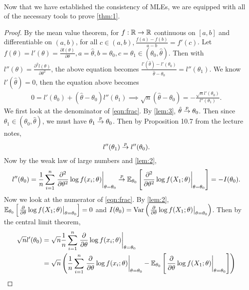 $ $\\
Now that we have established the consistency of MLEs, we are equipped with all of the necessary tools to prove \cref{thm:1}.
\begin{proof}
By the mean value theorem, for $f:\mathbb{R} \rightarrow \mathbb{R}$ continuous on $[a,b]$ and differentiable on $(a,b)$, for all $c\in(a,b), \frac{f(a)-f(b)}{a-b} = f'(c)$. Let $f(\theta) = l'(\theta) = \frac{\partial l(\theta)}{\partial \theta}, a=\hat{\theta}, b=\theta_0, c=\theta_1 \in (\theta_0, \hat{\theta})$. Then with $l''(\theta) = \frac{\partial^2 l(\theta)}{\partial \theta^2}$, the above equation becomes $\frac{l'(\hat{\theta}) - l'(\theta_0)}{\hat{\theta} - \theta_0} = l''(\theta_1)$. We know $l'(\hat{\theta}) = 0$, then the equation above becomes
\begin{align}
0 = l'(\theta_0) + (\hat{\theta} - \theta_0)l''(\theta_1) \implies \sqrt{n}(\hat{\theta} - \theta_0) = -\frac{\sqrt{n}l'(\theta_0)}{l''(\theta_1)}. \label{eqn:frac}
\end{align}
We first look at the denominator of \cref{eqn:frac}. By \cref{lem:3}, $\hat{\theta} \overset{p}{\rightarrow} \theta_0$. Then since $\theta_1\in(\theta_0, \hat{\theta})$, we must have $\theta_1 \overset{p}{\rightarrow} \theta_0$. Then by Proposition 10.7 from the lecture notes, 
\begin{align*}
l''(\theta_1) \overset{p}{\rightarrow} l''(\theta_0).
\end{align*}
Now by the weak law of large numbers and \cref{lem:2},
\begin{align}
l''(\theta_0) = \frac{1}{n}\sum_{i=1}^n \left.\frac{\partial^2}{\partial \theta^2}\log f(x_i; \theta)\right\vert_{\theta=\theta_0} \overset{p}{\rightarrow} \mathbb{E}_{\theta_0}\left[ \left.\frac{\partial^2}{\partial \theta^2}\log f(X_1; \theta)\right\vert_{\theta=\theta_0} \right] = -I(\theta_0). \label{eqn:denom}
\end{align}
Now we look at the numerator of \cref{eqn:frac}. By \cref{lem:2}, $\mathbb{E}_{\theta_0}\left[ \left.\frac{\partial}{\partial\theta}\log f(X_1;\theta)\right\vert_{\theta=\theta_0} \right] = 0$ and $I(\theta_0) = \text{Var}\left( \left.\frac{\partial}{\partial\theta}\log f(X_1;\theta)\right\vert_{\theta=\theta_0} \right)$. Then by the central limit theorem,
\begin{align}
\sqrt{n}l'(\theta_0) &= \sqrt{n}\frac{1}{n}\sum_{i=1}^n \left.\frac{\partial}{\partial\theta}\log f(x_i;\theta)\right\vert_{\theta=\theta_0}\nonumber\\
&= \sqrt{n}\left( \frac{1}{n}\sum_{i=1}^n \left.\frac{\partial}{\partial\theta}\log f(x_i;\theta)\right\vert_{\theta=\theta_0} - \bbE_{\theta_0}\left[ \left.\frac{\partial}{\partial\theta}\log f(X_1;\theta)\right\vert_{\theta=\theta_0} \right] \right)\nonumber\\

\end{align}
\end{proof}
